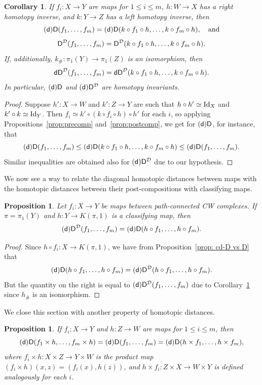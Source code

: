 \documentclass[amscd,amssymb,verbatim,10pt]{amsart}
\numberwithin{equation}{section}
\theoremstyle{plain}
\newtheorem{proposition}[theorem]{Proposition}
\newtheorem{corollary}[theorem]{Corollary}
\theoremstyle{definition}
\def\id{\protect\operatorname{Id}}
\newcommand{\D}{{\sf {D}}}
\newcommand{\sd}{{(\sf {d})}}
\newcommand{\dD}{{\sf {dD}}}
\newcommand{\cD}{{\mathcal{D}}}
\begin{document}
\begin{corollary}\label{cor: homotopy-invariance}
    If $f_i\colon X\to Y$ are maps for $1\le i \le m$, $h\colon W\to X$ has a right homotopy inverse, and $k\colon Y\to Z$ has a left homotopy inverse, then 
    \[
    \sd\D(f_1,\dots,f_m)=\sd\D(k\circ f_1\circ h, \dots, k\circ f_m\circ h), \quad \text{and}
    \]
    \[
    \D^{\cD}(f_1,\dots,f_m)=\D^{\cD}(k\circ f_1\circ h, \dots, k\circ f_m\circ h).
    \]
    If, additionally, $k_\#\colon \pi_1(Y)\to \pi_1(Z)$ is an isomorphism, then
    \[
    \dD^{\cD}(f_1,\dots,f_m)=\dD^{\cD}(k\circ f_1\circ h, \dots, k\circ f_m\circ h).
    \]
    In particular, $\sd\D$ and $\sd\D^{\cD}$ are homotopy invariants.
\end{corollary}
\begin{proof}
    Suppose $h'\colon X\to W$ and $k'\colon Z\to Y$ are such that $h\circ h'\simeq\id_X$ and $k'\circ k\simeq \id_Y$. Then $f_i\simeq k'\circ (k\circ f_i\circ h)\circ h'$ for each $i$, so applying Propositions~\ref{prop:precomp} and~\ref{prop:postcomp}, we get for $\sd\D$, for instance, that
    \[
    \sd\D(f_1,\dots,f_m)\le \sd\D(k\circ f_1\circ h,\dots,k\circ f_m\circ h)\le \sd\D(f_1,\dots,f_m). 
    \]
Similar inequalities are obtained also for $\sd\D^{\cD}$ due to our hypothesis.
\end{proof}

We now see a way to relate the diagonal homotopic distances between maps with the homotopic distances between their post-compositions with classifying maps.

\begin{proposition}\label{prop:classmap}
Let $f_i\colon X\to Y$ be maps between path-connected CW complexes. If $\pi=\pi_1(Y)$ and $h\colon Y \to K(\pi,1)$ is a classifying map, then
\[
\sd\D^\cD(f_1,\dots,f_m) = \sd\D(h\circ f_1,\dots,h\circ f_m).
\]
\end{proposition}
\begin{proof}
Since $h\circ f_i\colon X\to K(\pi,1)$, we have from Proposition~\ref{prop: cd-D vs D} that
\[
\sd\D(h\circ f_1,\dots,h\circ f_m)=\sd\D^{\cD}(h\circ f_1,\dots,h\circ f_m).
\]
But the quantity on the right is equal to $\sd\D^\cD(f_1,\dots,f_m)$ due to Corollary~\ref{cor: homotopy-invariance} since $h_{\#}$ is an isomorphism.
\end{proof}


We close this section with another property of homotopic distances.

\begin{proposition}\label{prop: product of maps}
    If $f_i\colon X\to Y$ and $h\colon Z\to W$ are maps for $1\le i \le m$, then
    \[
    \sd\D(f_1\times h,\dots,f_m\times h)=\sd\D(f_1,\dots,f_m)=\sd\D(h\times f_1,\dots,h\times f_m),
    \]
    where $f_i\times h\colon X\times Z\to Y\times W$ is the product map $(f_i\times h)(x,z)=(f_i(x),h(z))$, and $h\times f_i\colon Z\times X\to W\times Y$ is defined analogously for each $i$.
\end{proposition}
\end{document}
